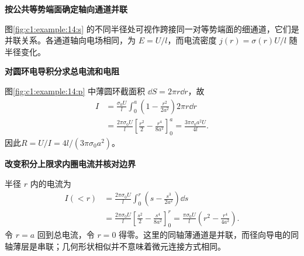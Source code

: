 \begin{solution}\textbf{按公共等势端面确定轴向通道并联}\par\nobreak
图\ref{fig:c1:example:14:s} 的不同半径处可视作跨接同一对等势端面的细通道，它们是并联关系。各通道轴向电场相同，为 $E=U/l$，而电流密度 $j(r)=\sigma(r)U/l$ 随半径变化。



\par\medskip{}\noindent\textbf{对圆环电导积分求总电流和电阻}\par\nobreak
图\ref{fig:c1:example:14:p} 中薄圆环截面积 $\dd S=2\pi r\dd r$，故
\begin{align*}
 I&=\frac{\sigma_0U}{l}\int_0^a\left(1-\frac{r^2}{2a^2}\right)2\pi r\dd r\\
 &=\frac{2\pi\sigma_0U}{l}\left[\frac{r^2}{2}-\frac{r^4}{8a^2}\right]_0^a
 =\frac{3\pi\sigma_0a^2U}{4l}.
\end{align*}
因此$R=U/I=4l/(3\pi\sigma_0a^2)$。


\par\medskip{}\noindent\textbf{改变积分上限求内圈电流并核对边界}\par\nobreak
半径 $r$ 内的电流为
\[
 \begin{aligned}
 I(<r)&=\frac{2\pi\sigma_0U}{l}
 \int_0^r\left(s-\frac{s^3}{2a^2}\right)\dd s\\
 &=\frac{2\pi\sigma_0U}{l}
 \left[\frac{s^2}{2}-\frac{s^4}{8a^2}\right]_0^r
 =\frac{\pi\sigma_0U}{l}\left(r^2-\frac{r^4}{4a^2}\right).
\end{aligned}
\]
令 $r=a$ 回到总电流，令 $r=0$ 得零。这里的同轴薄通道是并联，而径向导电的同轴薄层是串联；几何形状相似并不意味着微元连接方式相同。\end{solution}
